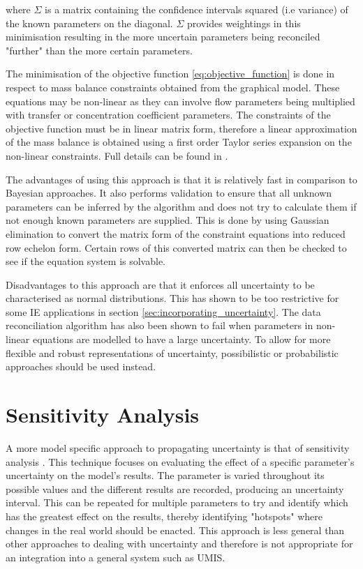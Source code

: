 \documentclass[ %
                    author={Tom Jager},
                supervisor={Dr. Daniel Schien},
                    degree={MEng},
                     title={A Bayesian Inference Engine for Calibrating Uncertainty over UMIS Structured MFA Systems},
                  subtitle={},
                      type={research},
                      year={2019} ]{dissertation}
\begin{document}
where $\Sigma$ is a matrix containing the confidence intervals squared (i.e variance) of the known parameters on the diagonal. $\Sigma$ provides weightings in this minimisation resulting in the more uncertain parameters being reconciled "further" than the more certain parameters. 

The minimisation of the objective function \ref{eq:objective_function} is done in respect to mass balance constraints obtained from the graphical model. These equations may be non-linear as they can involve flow parameters being multiplied with transfer or concentration coefficient parameters. The constraints of the objective function must be in linear matrix form, therefore a linear approximation of the mass balance is obtained using a first order Taylor series expansion on the non-linear constraints. Full details can be found in \cite{cencic2016nonlinear}. 

The advantages of using this approach is that it is relatively fast in comparison to Bayesian approaches. It also performs validation to ensure that all unknown parameters can be inferred by the algorithm and does not try to calculate them if not enough known parameters are supplied. This is done by using Gaussian elimination to convert the matrix form of the constraint equations into reduced row echelon form. Certain rows of this converted matrix can then be checked to see if the equation system is solvable.

Disadvantages to this approach are that it enforces all uncertainty to be characterised as normal distributions. This has shown to be too restrictive for some IE applications in section \ref{sec:incorporating_uncertainty}. The data reconciliation algorithm has also been shown to fail when parameters in non-linear equations are modelled to have a large uncertainty. To allow for more flexible and robust representations of uncertainty, possibilistic or probabilistic approaches should be used instead.

\section{Sensitivity Analysis}
A more model specific approach to propagating uncertainty is that of sensitivity analysis \cite{laner2014systematic}. This technique focuses on evaluating the effect of a specific parameter's uncertainty on the model's results. The parameter is varied throughout its possible values and the different results are recorded, producing an uncertainty interval. This can be repeated for multiple parameters to try and identify which has the greatest effect on the results, thereby identifying "hotspots" where changes in the real world should be enacted. This approach is less general than other approaches to dealing with uncertainty and therefore is not appropriate for an integration into a general system such as UMIS.
\end{document}
